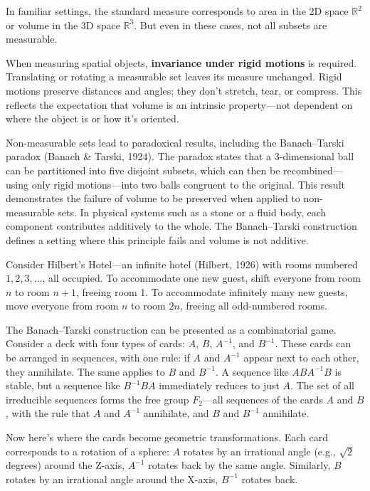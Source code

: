 In familiar settings, the standard measure corresponds to area in the 2D space $\mathbb{R}^2$ or volume in the 3D space $\mathbb{R}^3$. But even in these cases, not all subsets are measurable.

When measuring spatial objects, \textbf{invariance under rigid motions} is required. Translating or rotating a measurable set leaves its measure unchanged. Rigid motions preserve distances and angles; they don’t stretch, tear, or compress. This reflects the expectation that volume is an intrinsic property—not dependent on where the object is or how it's oriented.

Non-measurable sets lead to paradoxical results, including the Banach–Tarski paradox (Banach \& Tarski, 1924). The paradox states that a 3-dimensional ball can be partitioned into five disjoint subsets, which can then be recombined—using only rigid motions—into two balls congruent to the original. This result demonstrates the failure of volume to be preserved when applied to non-measurable sets. In physical systems such as a stone or a fluid body, each component contributes additively to the whole. The Banach–Tarski construction defines a setting where this principle fails and volume is not additive.

Consider Hilbert's Hotel—an infinite hotel (Hilbert, 1926) with rooms numbered $1, 2, 3, \ldots$, all occupied. To accommodate one new guest, shift everyone from room $n$ to room $n+1$, freeing room 1. To accommodate infinitely many new guests, move everyone from room $n$ to room $2n$, freeing all odd-numbered rooms.

The Banach–Tarski construction can be presented as a combinatorial game. Consider a deck with four types of cards: $A$, $B$, $A^{-1}$, and $B^{-1}$. These cards can be arranged in sequences, with one rule: if $A$ and $A^{-1}$ appear next to each other, they annihilate. The same applies to $B$ and $B^{-1}$. A sequence like $ABA^{-1}B$ is stable, but a sequence like $B^{-1}BA$ immediately reduces to just $A$. The set of all irreducible sequences forms the free group $F_2$—all sequences of the cards $A$ and $B$, with the rule that $A$ and $A^{-1}$ annihilate, and $B$ and $B^{-1}$ annihilate.

Now here's where the cards become geometric transformations. Each card corresponds to a rotation of a sphere: $A$ rotates by an irrational angle (e.g., $\sqrt{2}$ degrees) around the Z-axis, $A^{-1}$ rotates back by the same angle. Similarly, $B$ rotates by an irrational angle around the X-axis, $B^{-1}$ rotates back.


